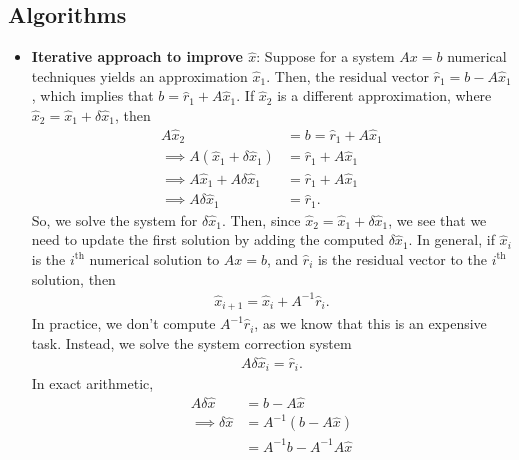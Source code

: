 \documentclass{report}
\begin{document}
    \bigbreak \noindent 
    \subsection{Algorithms}
    \begin{itemize}
        \item \textbf{Iterative approach to improve $\hat{x}$}: Suppose for a system $Ax = b$ numerical techniques yields an approximation $\hat{x}_{1}$. Then, the residual vector $\hat{r}_{1} = b - A\hat{x}_{1}$, which implies that $b = \hat{r}_{1} + A\hat{x}_{1}$. If $\hat{x}_{2}$ is a different approximation, where $\hat{x}_{2} = \hat{x}_{1} + \delta \hat{x}_{1}$, then
            \begin{align*}
                A\hat{x}_{2} &= b = \hat{r}_{1} + A\hat{x}_{1} \\
                \implies A(\hat{x}_{1} + \delta \hat{x}_{1}) &= \hat{r}_{1} + A\hat{x}_{1} \\
                \implies A\hat{x}_{1} + A\delta\hat{x}_{1} &= \hat{r}_{1} + A\hat{x}_{1} \\
                \implies A\delta\hat{x}_{1} &= \hat{r}_{1}  
            .\end{align*}
            So, we solve the system for $\delta \hat{x}_{1}$. Then, since $\hat{x}_{2} = \hat{x}_{1} + \delta \hat{x}_{1}$, we see that we need to update the first solution by adding the computed $\delta \hat{x}_{1} $.
            \bigbreak \noindent 
            In general, if $\hat{x}_{i}$ is the $i^{\text{th}}$ numerical solution to $Ax = b$, and $\hat{r}_{i}$ is the residual vector to the $i^{\text{th}}$ solution, then 
            \begin{align*}
                \hat{x}_{i+1} = \hat{x}_{i} + A^{-1}\hat{r}_{i}
            .\end{align*}
            In practice, we don't compute $A^{-1}\hat{r}_{i}$, as we know that this is an expensive task. Instead, we solve the system correction system
            \begin{align*}
                A\delta\hat{x}_{i} = \hat{r}_{i} 
            .\end{align*}
            In exact arithmetic, 
            \begin{align*}
                A\delta \hat{x} &= b - A\hat{x} \\
                \implies \delta \hat{x} &= A^{-1}\left(b - A\hat{x}\right) \\
                                        &= A^{-1}b - A^{-1}A\hat{x} \\

\end{align*}
\end{itemize}
\end{document}
